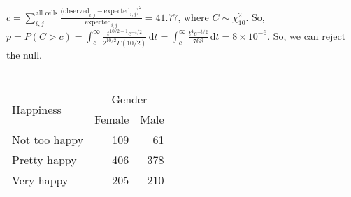 \documentclass[twocolumn]{article}
\newcommand{\setsection}[1]{\setcounter{section}{#1}\addtocounter{section}{-1}\section{}}
\newcommand{\intg}[4]{\int_{#1}^{#2} \! #3 \, \mathrm{d}#4}
\begin{document}
$c=\sum_{i,j}^\text{all cells}\frac{\text{(observed}_{i,j}-\text{expected}_{i,j})^2}{\text{expected}_{i,j}}=41.77$, where $C\sim\chi^2_{10}$. So, $p=P(C>c)=\intg{c}{\infty}{
	\frac{
	t^{10/2-1}e^{-t/2}
	}{
	2^{10/2}\Gamma(10/2)
	}
}{t}
=\intg{c}{\infty}{
	\frac{
	t^{4}e^{-t/2}
	}{
	768
	}
}{t}=8\times10^{-6}$.
So, we can reject the null.

\setsection{17}

\begin{table}[h]
\begin{tabular}{@{}lrr@{}}
\toprule
\multirow{2}{*}{Happiness} & \multicolumn{2}{c}{Gender}                            \\ \cmidrule(l){2-3} 
                           & \multicolumn{1}{l}{Female} & \multicolumn{1}{l}{Male} \\ \midrule
Not too happy              & 109                        & 61                       \\
Pretty happy               & 406                        & 378                      \\
Very happy                 & 205                        & 210                      \\ \bottomrule
\end{tabular}
\end{table}

\setsection{19}

\setsection{22}

\setsection{25}

\setsection{29}
\end{document}

